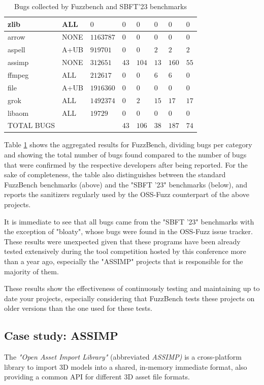 \begin{table}[h]
{\begin{tabular}{|l|l|l|l|l|l|l|l|}
zlib   &ALL   &$0$   &$0$   &$0$   &$0$   &$0$   &$0$ \\
\hline
arrow   &NONE   &$1163787$   &$0$   &$0$   &$0$   &$0$   &$0$ \\
aspell   &A+UB   &$919701$   &$0$   &$0$   &$2$   &$2$   &$2$ \\
assimp   &NONE   &$312651$   &$43$   &$104$   &$13$   &$160$   &$55$ \\
ffmpeg   &ALL   &$212617$   &$0$   &$0$   &$6$   &$6$   &$0$ \\
file   &A+UB   &$1916360$   &$0$   &$0$   &$0$   &$0$   &$0$ \\
grok   &ALL   &$1492374$   &$0$   &$2$   &$15$   &$17$   &$17$ \\
libaom   &ALL   &$19729$   &$0$   &$0$   &$0$   &$0$   &$0$ \\
\hline
TOTAL BUGS   &   &   &$43$   &$106$   &$38$   &$187$   &$74$          \\
\hline
\end{tabular}}
\vspace{10pt}
\caption{Bugs collected by Fuzzbench and SBFT'23 benchmarks}
\label{fuzzbench-table}
\end{table}
Table \ref{fuzzbench-table} shows the aggregated results for FuzzBench, dividing bugs per category and showing the total number of bugs found compared to the number of bugs that were confirmed by the respective developers after being reported. For the sake of completeness, the table also distinguishes between the standard FuzzBench benchmarks (above) and the "SBFT '23" benchmarks (below), and reports the sanitizers regularly used by the OSS-Fuzz counterpart of the above projects.

It is immediate to see that all bugs came from the "SBFT '23" benchmarks with the exception of "bloaty", whose bugs were found in the OSS-Fuzz issue tracker. These results were unexpected given that these programs have been already tested extensively during the tool competition hosted by this conference more than a year ago, especially the "ASSIMP" projects that is responsible for the majority of them.

These results show the effectiveness of continuously testing and maintaining up to date your projects, especially considering that FuzzBench tests these projects on older versions than the one used for these tests. 






\newpage
\subsection{Case study: ASSIMP}
The \textit{"Open Asset Import Library"} (abbreviated \textit{ASSIMP)} \cite{assimp} is a cross-platform library to import 3D models into a shared, in-memory immediate format, also providing a common API for different 3D asset file formats.

